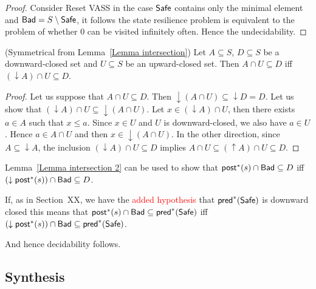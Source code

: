 \begin{proof}
Consider Reset VASS
in the case $\textsf{Safe}$ contains only the minimal element %
and $\textsf{Bad} = S \setminus \textsf{Safe}$, 
it follows the state resilience problem is equivalent 
to the problem of whether $0$ can be visited infinitely often. 
%
Hence the undecidability.
\end{proof}



\begin{lemma}(Symmetrical from Lemma~\ref{Lemma intersection})\label{Lemma intersection 2}
Let $A \subseteq S$, $D \subseteq S$ be a downward-closed set and $U \subseteq S$ be an upward-closed set. 
Then $A \cap U \subseteq D$  iff $ (\downarrow  A) \cap U \subseteq D$.
\end{lemma}


\begin{proof}
Let us suppose that $A \cap U \subseteq D$. Then ${\downarrow (A \cap U)} \subseteq {\downarrow D} = D$.
Let us show that $({\downarrow A}) \cap U \subseteq {\downarrow (A \cap U)}$.
Let $x \in ({\downarrow A}) \cap U$, then there exists $a \in A$ such that $x \leq a$.
Since $x \in U$ and $U$ is downward-closed, we also have $a \in U$.
Hence $a \in A \cap U$ and then $x \in { \downarrow (A \cap U)}$.
In the other direction,
since $A \subseteq {\downarrow A}$, the inclusion
$({\downarrow  A}) \cap U \subseteq D$ implies
$A \cap U \subseteq ({\uparrow  A}) \cap U \subseteq D$.
\end{proof}

Lemma~\ref{Lemma intersection 2} can be used to show that
$\textsf{post}^*(s) \cap \textsf{Bad} \subseteq D$  iff $ (\downarrow  \textsf{post}^*(s)) \cap \textsf{Bad} \subseteq D$.

If, as in Section~XX, we have the \textcolor{red}{added hypothesis}
that
$\textsf{pred}^*(\textsf{Safe})$ is downward closed this means that
$\textsf{post}^*(s) \cap \textsf{Bad} \subseteq \textsf{pred}^*(\textsf{Safe})$  iff $ (\downarrow  \textsf{post}^*(s)) \cap \textsf{Bad} \subseteq \textsf{pred}^*(\textsf{Safe})$.

And hence decidability follows.




\subsection{Synthesis}


